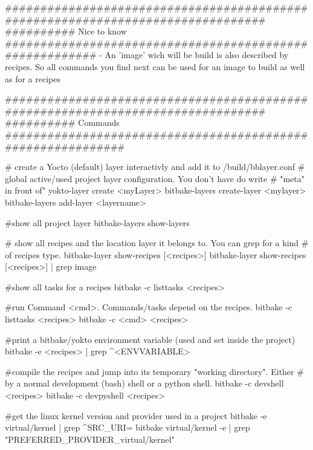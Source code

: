 

################################################################################
########## Nice to know ########################################################
- An 'image' wich will be build is also described by recipes. So all commands
  you find next can be used for an image to build as well as for a recipes




################################################################################
########## Commands ############################################################

# create a Yocto (default) layer interactivly and add it to /build/bblayer.conf
# global active/used project layer configuration. You don't have do write 
# "meta" in front of"
yokto-layer create <myLayer>
bitbake-layers create-layer <mylayer>
bitbake-layers add-layer <layername>




#show all project layer
bitbake-layers show-layers



# show all recipes and the location layer it belongs to. You can grep for a kind
# of recipes type. 
bitbake-layer show-recipes [<recipes>]
bitbake-layer show-recipes [<recipes>] | grep image


#show all tasks for a recipes
bitbake -c listtasks <recipes>


#run Command <cmd>. Commands/tasks depend on the recipes.
bitbake -c listtasks <recipes>
bitbake -c <cmd> <recipes>


#print a bitbake/yokto environment variable (used and set inside the project)
bitbake -e <recipes> | grep ^<ENVVARIABLE>



#compile the recipes and jump into its temporary "working directory". Either
# by a normal development (bash) shell or a python shell.
bitbake -c devshell <recipes>
bitbake -c devpyshell <recipes>


#get the linux kernel version and provider used in a project
bitbake -e virtual/kernel | grep ^SRC_URI=
bitbake virtual/kernel -e | grep  "PREFERRED_PROVIDER_virtual/kernel"








